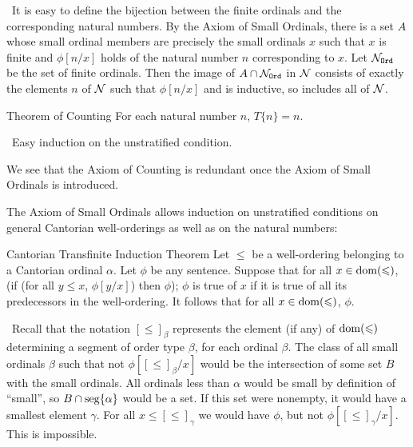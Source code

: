 \preuve\ It is easy to define the bijection between the
finite ordinals and the
corresponding natural numbers.  By the Axiom of Small 
Ordinals, there is a set $A$ whose small ordinal members are precisely
the small ordinals $x$ such that $x$ is finite and $\phi[n/x]$ holds
of the natural number $n$ corresponding to $x$.  Let ${\cal N}_{\tt Ord}$ be the set of
finite ordinals.  Then the image of $A \cap {\cal N}_{\tt Ord} $ in ${\cal N}$
consists of exactly the elements $n$ of ${\cal N}$ such that
$\phi[n/x]$ and is inductive, so includes all of ${\cal
N}$.
\finpreuve

\begin{Thm}{Theorem of Counting}
 For each natural number $n$, $T\{n\}=n$.
\end{Thm}

\preuve\ Easy induction on the unstratified condition.
\finpreuve

We see that the Axiom of Counting is redundant once the Axiom of Small
Ordinals is introduced.

The Axiom of Small Ordinals allows induction on unstratified
conditions on general Cantorian well-orderings as well as on the
natural numbers:

\begin{Thm}{Cantorian
Transfinite Induction Theorem}
 Let $\leq$ be a
 well-ordering belonging to a
 Cantorian ordinal $\alpha$.  Let $\phi$ 
 be any sentence.  Suppose that for all $x \in \mathop{\mathrm{dom}}(\leqslant)$, (if (for
 all $y \leq x$, $\phi[y/x]$) then $\phi$); $\phi$ is true of $x$ if it is
 true of all its predecessors in the well-ordering.  It follows that
 for all $x \in \mathop{\mathrm{dom}}(\leqslant)$, $\phi$.
\end{Thm}

\preuve\ Recall that the notation $[\leq]_{\beta}$ represents the
element (if any) of $\mathop{\mathrm{dom}}(\leqslant)$ determining a segment of order
type $\beta$, for each ordinal $\beta$.  The class of all
small ordinals $\beta$ such that not
$\phi[[\leq]_{\beta}/x]$ would be the intersection of some set $B$ with the small ordinals.  All ordinals 
less than $\alpha$ would be small by definition of ``small'', so $B
\cap \mathop{\mathrm{seg}}\{\alpha\}$ would be a set.  If this set were nonempty, it
would have a smallest element $\gamma$.  For all $x \leq
[\leq]_{\gamma}$ we would have $\phi$, but not
$\phi[[\leq]_{\gamma}/x]$. This is impossible.
\finpreuve

